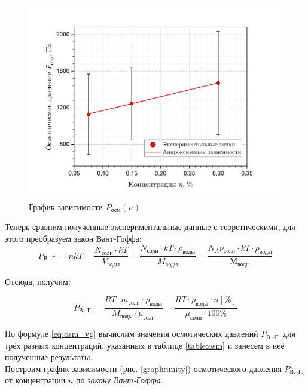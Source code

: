 \documentclass[a4paper, 12pt]{article}
\begin{document}
    \begin{figure}[H]
        \centering
        \includegraphics[width = 14 cm]{images/graph_osm.png}
        \caption{График зависимости $P_\text{осм}(n)$}
        \label{graph:osm}
    \end{figure}

    \noindent Теперь сравним полученные экспериментальные данные с теоретическими, для этого преобразуем закон Вант-Гоффа:
    $$
        P_\text{В.--Г.} = nkT = \frac{N_\text{соли} \cdot k T}{V_\text{воды}} = \frac{N_\text{соли} \cdot k T \cdot \rho_\text{воды}}{M_\text{воды}} = \frac{N_A \nu_\text{соли} \cdot k T \cdot \rho_\text{воды}}{М_\text{воды}}
    $$

    \noindent Отсюда, получим:

    \begin{equation}
        \label{eq:osm_vg}
        P_\text{В.--Г.} = \frac{RT \cdot m_\text{соли} \cdot \rho_\text{воды}}{M_\text{воды} \cdot \mu_\text{соли}} = \frac{RT \cdot \rho_\text{воды} \cdot n[\%]}{\mu_\text{соли} \cdot 100 \%}
    \end{equation}

    \noindent По формуле \ref{eq:osm_vg} вычислим значения осмотических давлений $P_\text{В.--Г.}$ для трёх разных концентраций, указанных в таблице \ref{table:osm} и занесём в неё полученные результаты. \\

    \noindent Построим график зависимости (рис. \ref{graph:unity}) осмотического давления $P_\text{В.--Г.}$ от концентрации $n$ по \textit{закону Вант-Гоффа}.
\end{document}
